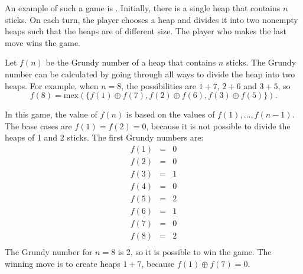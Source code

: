 
An example of such a game is .
Initially, there is a single heap that contains $n$ sticks.
On each turn, the player chooses a heap and divides
it into two nonempty heaps such that the heaps
are of different size.
The player who makes the last move wins the game.

Let $f(n)$ be the Grundy number of a heap
that contains $n$ sticks.
The Grundy number can be calculated by going
through all ways to divide the heap into
two heaps.
For example, when $n=8$, the possibilities
are $1+7$, $2+6$ and $3+5$, so
\[f(8)=\textrm{mex}(\{f(1) \oplus f(7), f(2) \oplus f(6), f(3) \oplus f(5)\}).\]

In this game, the value of $f(n)$ is based on the values
of $f(1),\ldots,f(n-1)$.
The base cases are $f(1)=f(2)=0$,
because it is not possible to divide the heaps
of 1 and 2 sticks.
The first Grundy numbers are:
\[
\begin{array}{lcl}
f(1) & = & 0 \\
f(2) & = & 0 \\
f(3) & = & 1 \\
f(4) & = & 0 \\
f(5) & = & 2 \\
f(6) & = & 1 \\
f(7) & = & 0 \\
f(8) & = & 2 \\
\end{array}
\]
The Grundy number for $n=8$ is 2,
so it is possible to win the game.
The winning move is to create heaps
$1+7$, because $f(1) \oplus f(7) = 0$.
